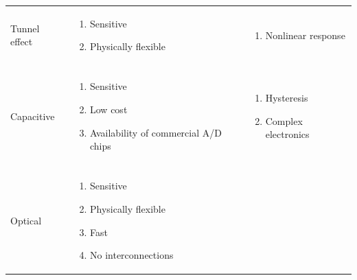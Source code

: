 \documentclass[english]{article}
\begin{document}
\begin{table}
\begin{center}
\begin{tabular}{ l l l }
  \\\\\hline
 
	   Tunnel effect 	
	   
	   &
	   
\begin{minipage}{2.5in}									
    \begin{enumerate}
   \item Sensitive
   \item Physically flexible
   \end{enumerate}
 \end{minipage}  
 
 &
 
\begin{minipage}{2.5in}									
    \begin{enumerate}
   \item Nonlinear response
   \end{enumerate}
 \end{minipage} 
 
 \\\\\hline
 
 	   Capacitive	
 	   
 	   &
 	   
 \begin{minipage}{2.5in}									
    \begin{enumerate}
   \item Sensitive
   \item Low cost
   \item Availability of commercial A/D chips
   \end{enumerate}
 \end{minipage}  
 
 &

\begin{minipage}{2.5in}									
    \begin{enumerate}
   \item Hysteresis
   \item Complex electronics
   \end{enumerate}
 \end{minipage} 
 
 \\\\\hline

 	   Optical			
 	   
 	   &
 	   		
 \begin{minipage}{2.5in}									
    \begin{enumerate}
   \item Sensitive
   \item Physically flexible
   \item Fast
   \item No interconnections
   \end{enumerate}
 \end{minipage} 
 

\end{tabular}
\end{center}
\end{table}
\end{document}
